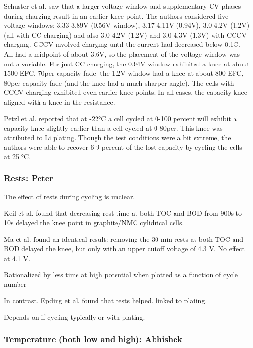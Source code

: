 \documentclass{article}
\begin{document}
Schuster et al. \cite{schuster_nonlinear_2015} saw that a larger voltage window and supplementary CV phases during charging result in an earlier knee point. The authors considered five voltage windows: 3.33-3.89V (0.56V window), 3.17-4.11V (0.94V), 3.0-4.2V (1.2V) (all with CC charging) and also 3.0-4.2V (1.2V) and 3.0-4.3V (1.3V) with CCCV charging. CCCV involved charging until the current had decreased below 0.1C. All had a midpoint of about 3.6V, so the placement of the voltage window was not a variable. For just CC charging, the 0.94V window exhibited a knee at about 1500 EFC, 70per capacity fade; the 1.2V window had a knee at about 800 EFC, 80per capacity fade (and the knee had a much sharper angle). The cells with CCCV charging exhibited even earlier knee points. In all cases, the capacity knee aligned with a knee in the resistance.

Petzl et al. \cite{petzl_lithium_2015} reported that at -22°C a cell cycled at 0-100 percent will exhibit a capacity knee slightly earlier than a cell cycled at 0-80per. This knee was attributed to Li plating. Though the test conditions were a bit extreme, the authors were able to recover 6-9 percent of the lost capacity by cycling the cells at 25 °C.  

\subsubsection{Rests: Peter}

The effect of rests during cycling is unclear.

Keil et al.\cite{keil_linear_2019} found that decreasing rest time at both TOC and BOD from 900s to 10s delayed the knee point in graphite/NMC cylidrical cells.

Ma et al.\cite{ma_editors_2019} found an identical result: removing the 30 min rests at both TOC and BOD delayed the knee, but only with an upper cutoff voltage of 4.3 V. No effect at 4.1 V.

Rationalized by less time at high potential when plotted as a function of cycle number

In contrast, Epding et al.\cite{epding_investigation_2019} found that rests helped, linked to plating.

Depends on if cycling typically or with plating.

\subsubsection{Temperature (both low and high): Abhishek}
\end{document}
